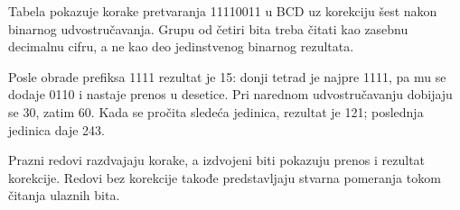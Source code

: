 Tabela pokazuje korake pretvaranja 11110011 u BCD uz korekciju šest nakon binarnog udvostručavanja. Grupu od četiri bita treba čitati kao zasebnu decimalnu cifru, a ne kao deo jedinstvenog binarnog rezultata.

Posle obrade prefiksa 1111 rezultat je 15: donji tetrad je najpre 1111, pa mu se dodaje 0110 i nastaje prenos u desetice. Pri narednom udvostručavanju dobijaju se 30, zatim 60. Kada se pročita sledeća jedinica, rezultat je 121; poslednja jedinica daje 243.

Prazni redovi razdvajaju korake, a izdvojeni biti pokazuju prenos i rezultat korekcije. Redovi bez korekcije takođe predstavljaju stvarna pomeranja tokom čitanja ulaznih bita.
